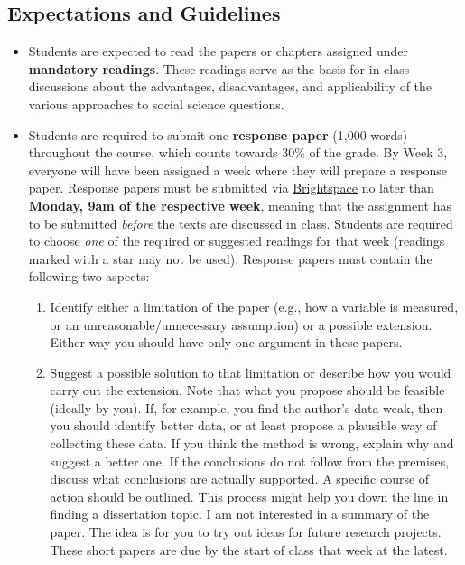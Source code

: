 \documentclass[abstract=on,parskip=full,headings=standardclasses,fontsize=11pt,paper=a4]{scrartcl}
\begin{document}
\subsection*{Expectations and Guidelines}
\begin{itemize}


\item Students are expected to read the papers or chapters assigned under \textbf{mandatory readings}. These readings serve as the basis for in-class discussions about the advantages, disadvantages, and applicability of the various approaches to social science questions. 

\item Students are required to submit one \textbf{response paper} (1,000 words) throughout the course, which counts towards 30\% of the grade. By Week 3, everyone will have been assigned a week where they will prepare a response paper. Response papers must be submitted via \href{https://brightspace.ucd.ie/d2l/home}{Brightspace} no later than \textbf{Monday, 9am of the respective week}, meaning that the assignment has to be submitted \textit{before} the texts are discussed in class. Students are required to choose \textit{one} of the required or suggested readings for that week (readings marked with a star may not be used).  Response papers must contain the following two aspects:
\begin{enumerate}
\item Identify either a limitation of the paper (e.g., how a variable is measured, or an unreasonable/unnecessary assumption) or a possible extension. Either way you should have only one argument in these papers.
\item Suggest a possible solution to that limitation or describe how you would carry out the extension. Note that what you propose should be feasible (ideally by you). If, for example, you find the author's data weak, then you should identify better data, or at least propose a plausible way of collecting these data. If you think the method is wrong, explain why and suggest a better one. If the conclusions do not follow from the premises, discuss what conclusions are actually supported. A specific course of action should be outlined. This process might help you down the line in finding a dissertation topic.
I am not interested in a summary of the paper. The idea is for you to try out ideas for future research projects. These short papers are due by the start of class that week at the latest. 
\end{enumerate}



\end{itemize}
\end{document}

